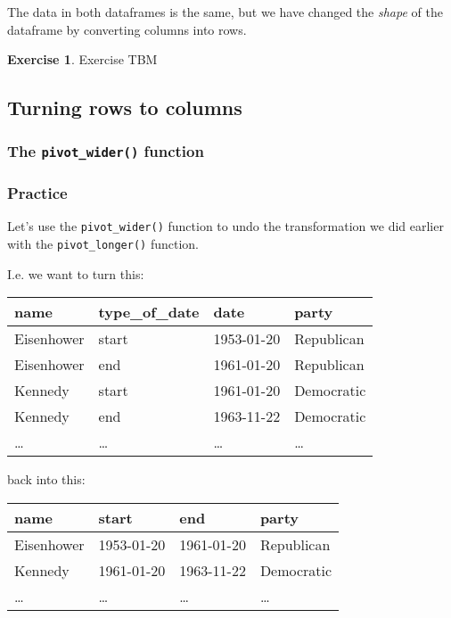 \documentclass[
]{article}
\theoremstyle{definition}
\theoremstyle{definition}
\theoremstyle{definition}
\newtheorem{exercise}{Exercise}[section]
\theoremstyle{definition}
\theoremstyle{remark}
\begin{document}
The data in both dataframes is the same, but we have changed the \emph{shape} of the dataframe by converting columns into rows.

\begin{exercise}
Exercise TBM
\end{exercise}

\hypertarget{turning-rows-to-columns}{%
\subsection{Turning rows to columns}\label{turning-rows-to-columns}}

\hypertarget{the-pivot_wider-function}{%
\subsubsection{\texorpdfstring{The \texttt{pivot\_wider()} function}{The pivot\_wider() function}}\label{the-pivot_wider-function}}

\hypertarget{practice-2}{%
\subsubsection{Practice}\label{practice-2}}

Let's use the \texttt{pivot\_wider()} function to undo the transformation we did earlier with the \texttt{pivot\_longer()} function.

I.e. we want to turn this:

\begin{longtable}[]{@{}llll@{}}
\toprule()
name & type\_of\_date & date & party \\
\midrule()
\endhead
Eisenhower & start & 1953-01-20 & Republican \\
Eisenhower & end & 1961-01-20 & Republican \\
Kennedy & start & 1961-01-20 & Democratic \\
Kennedy & end & 1963-11-22 & Democratic \\
\ldots{} & \ldots{} & \ldots{} & \ldots{} \\
\bottomrule()
\end{longtable}

back into this:

\begin{longtable}[]{@{}llll@{}}
\toprule()
name & start & end & party \\
\midrule()
\endhead
Eisenhower & 1953-01-20 & 1961-01-20 & Republican \\
Kennedy & 1961-01-20 & 1963-11-22 & Democratic \\
\ldots{} & \ldots{} & \ldots{} & \ldots{} \\
\bottomrule()
\end{longtable}
\end{document}
